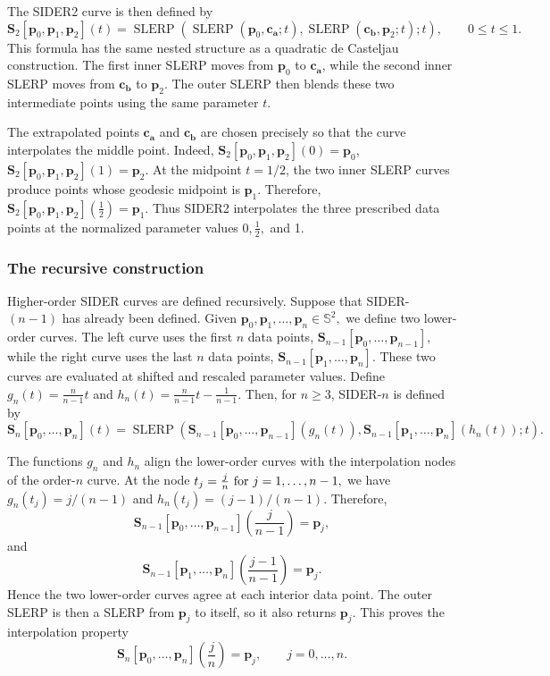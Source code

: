 \documentclass[a4paper,11pt]{article}
\newcommand{\bp}{\mathbf{p}}
\newcommand{\ba}{\mathbf{a}}
\newcommand{\bb}{\mathbf{b}}
\newcommand{\bc}{\mathbf{c}}
\numberwithin{equation}{section}
\theoremstyle{plain}
\theoremstyle{definition}
\theoremstyle{remark}
\newcommand{\Sph}{\mathbb{S}^2}
\newcommand{\slerp}{\operatorname{SLERP}}
\begin{document}
The SIDER2 curve is then defined by
\begin{equation}
\label{eq:sider2}
        \mathbf{S}_2[\bp_0,\bp_1,\bp_2](t)
        =
        \slerp\!\left(
        \slerp(\bp_0,\bc_\ba;t),
        \slerp(\bc_\bb,\bp_2;t);
        t
        \right),
        \qquad 0\leq t\leq 1.
\end{equation}
This formula has the same nested structure as a quadratic de Casteljau construction.  The first inner SLERP moves from $\bp_0$ to $\bc_\ba$, while the second inner SLERP moves from $\bc_\bb$ to $\bp_2$.  The outer SLERP then blends these two intermediate points using the same parameter $t$.

The extrapolated points $\bc_\ba$ and $\bc_\bb$ are chosen precisely so that the curve interpolates the middle point.  Indeed,
\(\mathbf{S}_2[\bp_0,\bp_1,\bp_2](0)=\bp_0\), \(\mathbf{S}_2[\bp_0,\bp_1,\bp_2](1)=\bp_2.\)
At the midpoint $t=1/2$, the two inner SLERP curves produce points whose geodesic midpoint is $\bp_1$.  Therefore,
\(\mathbf{S}_2[\bp_0,\bp_1,\bp_2]\!\left(\frac12\right)=\bp_1.\)
Thus SIDER2 interpolates the three prescribed data points at the normalized parameter values
\(0,\frac12,\) and 1.

\subsubsection{The recursive construction}

Higher-order SIDER curves are defined recursively.  Suppose that SIDER-$(n-1)$ has already been defined.  Given
\(\bp_0,\bp_1,\ldots,\bp_n\in \Sph,\)
we define two lower-order curves.  The left curve uses the first $n$ data points,
\(\mathbf{S}_{n-1}[\bp_0,\ldots,\bp_{n-1}],\)
while the right curve uses the last $n$ data points,
\(\mathbf{S}_{n-1}[\bp_1,\ldots,\bp_n].\)
These two curves are evaluated at shifted and rescaled parameter values.  Define
\(g_n(t)=\frac{n}{n-1}t\) and \(h_n(t)=\frac{n}{n-1}t-\frac{1}{n-1}\).
Then, for $n\geq 3$, SIDER-$n$ is defined by
\begin{equation}
\label{eq:sider-n}
        \mathbf{S}_n[\bp_0,\ldots,\bp_n](t)
        =
        \slerp\!\left(
        \mathbf{S}_{n-1}[\bp_0,\ldots,\bp_{n-1}](g_n(t)),
        \mathbf{S}_{n-1}[\bp_1,\ldots,\bp_n](h_n(t));
        t
        \right).
\end{equation}

The functions $g_n$ and $h_n$ align the lower-order curves with the interpolation nodes of the order-$n$ curve.  At the node
\(t_j=\frac{j}{n}$ for $ j=1,\ldots,n-1,\)
we have
\(g_n(t_j)=j/(n-1)\) and \(h_n(t_j)=(j-1)/(n-1)\).
Therefore,
\[
        \mathbf{S}_{n-1}[\bp_0,\ldots,\bp_{n-1}]\!\left(\frac{j}{n-1}\right)=\bp_j,
\]
and
\[
        \mathbf{S}_{n-1}[\bp_1,\ldots,\bp_n]\!\left(\frac{j-1}{n-1}\right)=\bp_j.
\]
Hence the two lower-order curves agree at each interior data point.  The outer SLERP is then a SLERP from $\bp_j$ to itself, so it also returns $\bp_j$.  This proves the interpolation property
\[
        \mathbf{S}_n[\bp_0,\ldots,\bp_n]\!\left(\frac{j}{n}\right)=\bp_j,
        \qquad j=0,\ldots,n.
\]
\end{document}
